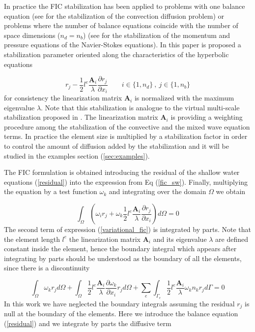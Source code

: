 \documentclass[a4paper,12pt]{article}
\newcommand{\pder}[2]{\frac{\partial#1}{\partial#2}}
\begin{document}

In practice the FIC stabilization has been applied to problems with one balance equation (see \cite{onate1998} for the stabilization of the convection diffusion problem) or problems where the number of balance equations coincide with the number of space dimensions ($n_d = n_b$) (see \cite{onate1998} for the stabilization of the momentum and pressure equations of the Navier-Stokes equations). In this paper is proposed a stabilization parameter oriented along the characteristics of the hyperbolic equations

\begin{equation} \label{fic_sw}
r_j - \frac{1}{2}l^e\frac{\mathbf{A}_i}{\lambda}\pder{r_j}{x_i}
    \qquad i\in\{1,n_d\} \ ,\ j\in\{1,n_b\}
\end{equation}
for consistency the linearization matrix $\mathbf{A}_i$ is normalized with the maximum eigenvalue $\lambda$. Note that this stabilization is analogue to the virtual multi-scale stabilization proposed in \cite{codina2008b}. The linearization matrix $\mathbf{A}_i$ is providing a weighting procedure among the stabilization of the convective and the mixed wave equation terms. In practice the element size is multiplied by a stabilization factor in order to control the amount of diffusion added by the stabilization and it will be studied in the examples section (\ref{sec:examples}).

The FIC formulation is obtained introducing the residual of the shallow water equations (\ref{residual}) into the expression from Eq (\ref{fic_sw}). Finally, multiplying the equation by a test function $\omega_k$ and integrating over the domain $\Omega$ we obtain

\begin{equation} \label{variational_fic}
\int_\Omega \left(
    \omega_i r_j + \omega_k \frac{1}{2}l^e\frac{\mathbf{A}_i}{\lambda}\pder{r_j}{x_i}
\right) d\Omega = 0
\end{equation}
The second term of expression (\ref{variational_fic}) is integrated by parts. Note that the element length $l^e$ the linearization matrix $\mathbf{A}_i$ and its eigenvalue $\lambda$ are defined constant inside the element, hence the boundary integral which appears after integrating by parts should be understood as the boundary of all the elements, since there is a discontinuity

\begin{equation} \label{variational_fic_parts}
\int_\Omega \omega_k r_j d\Omega
+ \int_\Omega \frac{1}{2}l^e\frac{\mathbf{A}_i}{\lambda}\pder{\omega_k}{x_i} r_j d\Omega
+ \sum_e \int_{\Gamma_e} \frac{1}{2}l^e\frac{\mathbf{A}_i}{\lambda}\omega_kn_kr_j d\Gamma = 0
\end{equation}
In this work we have neglected the boundary integrals assuming the residual $r_j$ is null at the boundary of the elements. Here we introduce the balance equation (\ref{residual}) and we integrate by parts the diffusive term
\end{document}
